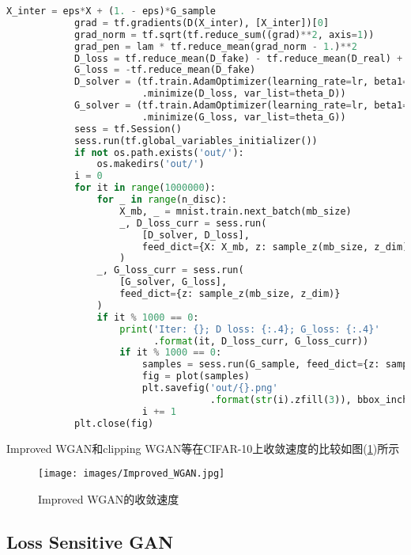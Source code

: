 \begin{lstlisting}[language = Python]
            X_inter = eps*X + (1. - eps)*G_sample
            grad = tf.gradients(D(X_inter), [X_inter])[0]
            grad_norm = tf.sqrt(tf.reduce_sum((grad)**2, axis=1))
            grad_pen = lam * tf.reduce_mean(grad_norm - 1.)**2
            D_loss = tf.reduce_mean(D_fake) - tf.reduce_mean(D_real) + grad_pen
            G_loss = -tf.reduce_mean(D_fake)
            D_solver = (tf.train.AdamOptimizer(learning_rate=lr, beta1=0.5)
                        .minimize(D_loss, var_list=theta_D))
            G_solver = (tf.train.AdamOptimizer(learning_rate=lr, beta1=0.5)
                        .minimize(G_loss, var_list=theta_G))
            sess = tf.Session()
            sess.run(tf.global_variables_initializer())
            if not os.path.exists('out/'):
                os.makedirs('out/')
            i = 0
            for it in range(1000000):
                for _ in range(n_disc):
                    X_mb, _ = mnist.train.next_batch(mb_size)
                    _, D_loss_curr = sess.run(
                        [D_solver, D_loss],
                        feed_dict={X: X_mb, z: sample_z(mb_size, z_dim)}
                    )
                _, G_loss_curr = sess.run(
                    [G_solver, G_loss],
                    feed_dict={z: sample_z(mb_size, z_dim)}
                )
                if it % 1000 == 0:
                    print('Iter: {}; D loss: {:.4}; G_loss: {:.4}'
                          .format(it, D_loss_curr, G_loss_curr))
                    if it % 1000 == 0:
                        samples = sess.run(G_sample, feed_dict={z: sample_z(16, z_dim)})
                        fig = plot(samples)
                        plt.savefig('out/{}.png'
                                    .format(str(i).zfill(3)), bbox_inches='tight')
                        i += 1
            plt.close(fig)
            \end{lstlisting}
            \par
            Improved WGAN和clipping WGAN等在CIFAR-10上收敛速度的比较如图(\ref{fig:Improved WGAN的收敛速度})所示
                \begin{figure}[H]
                \centering
                \texttt{[image: images/Improved\_WGAN.jpg]}
                \caption{Improved WGAN的收敛速度}
                \label{fig:Improved WGAN的收敛速度}
                \end{figure}

    \subsection{Loss Sensitive GAN}
